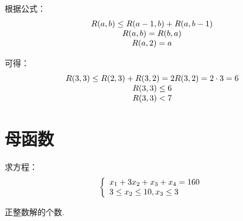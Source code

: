 \documentclass[cn, hazy, blue, normal, 12pt]{elegantnote}
\begin{document}
\begin{solution}[print=true]

    根据公式：
    \begin{equation}
        \notag
        \begin{array}{c}
            R(a, b) \leq R(a-1, b)+R(a, b-1) \\
            R(a, b) = R(b, a)                \\
            R(a, 2) = a
        \end{array}
    \end{equation}

    可得：
    \begin{equation}
        \notag
        \begin{array}{c}
            R(3, 3) \leq R(2, 3) + R(3, 2) = 2 R(3, 2) = 2 \cdot 3 = 6 \\
            R(3, 3) \leq 6                                             \\
            R(3, 3) < 7
        \end{array}
    \end{equation}

\end{solution}


\section{母函数}

\begin{exercise}

    求方程：
    \begin{equation}
        \notag
        \left\{\begin{array}{l}
            x_{1}+3 x_{2}+x_{3}+x_{4}=160 \\
            3 \leq x_{2} \leq 10, x_{3} \leq 3
        \end{array}\right.
    \end{equation}

    正整数解的个数.

\end{exercise}
\end{document}
